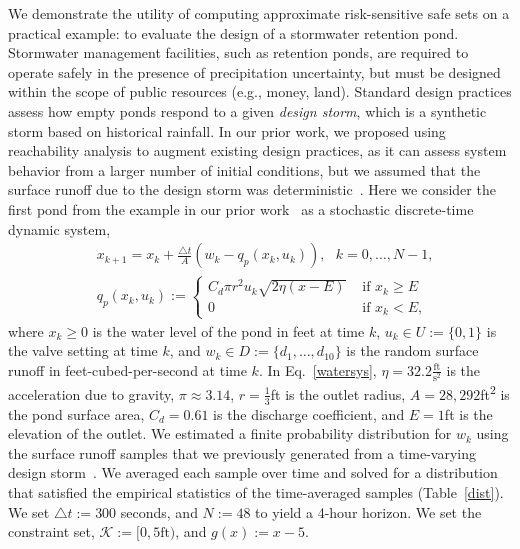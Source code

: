 \documentclass[letterpaper, 10 pt, conference]{ieeeconf}  %
\begin{document}
We demonstrate the utility of computing approximate risk-sensitive safe sets on a practical example:
to evaluate the design of a stormwater retention pond. 
Stormwater management facilities, such as retention ponds, are required to operate safely 
in the presence of precipitation uncertainty, but must be designed within the scope of public resources (e.g., money, land). 
Standard design practices assess how empty ponds respond to a given \textit{design storm},
which is a synthetic storm based on historical rainfall.  
In our prior work, we proposed using reachability analysis to augment existing design practices, as it can assess 
system behavior from a larger number of initial conditions, but we assumed that the surface runoff due to the design storm was deterministic~\cite{sustech}.
Here we consider the first pond from the example in our prior work~\cite{sustech} as a stochastic discrete-time dynamic system,
\begin{equation}\begin{aligned}
& x_{k+1} = x_k + \frac{\triangle t}{A} (w_k - q_p(x_k, u_k)), \text{ }k = 0, \dots, N-1, \\
& q_p(x_k,u_k) := \begin{cases} C_d \pi r^2 u_k \sqrt{ 2\eta(x-E) } & \text{ if } x_k \geq E \\
						0 & \text{ if } x_k < E, \end{cases}
\end{aligned}\label{watersys}\end{equation}
where $x_k \geq 0$ is the water level of the pond in feet at time $k$, $u_k \in U := \{0, 1\}$ is the valve setting at time $k$,
and $w_k \in D := \{d_1, \dots, d_{10}\}$ is the random surface runoff in feet-cubed-per-second at time $k$.
In Eq.~\eqref{watersys}, $\eta = 32.2\frac{\text{ft}}{\text{s}^2}$ is the acceleration due to gravity, $\pi \approx 3.14$, 
$r = \frac{1}{3}$ft is the outlet radius, $A = 28,292$ft\textsuperscript{2} is the pond surface area, $C_d = 0.61$ is the discharge coefficient,
and $E = 1$ft is the elevation of the outlet. %
We estimated a finite probability distribution for $w_k$ using the surface runoff samples that we previously generated from a time-varying design storm~\cite{sustech}. 
We averaged each sample over time and solved for a distribution
that satisfied the empirical statistics of the time-averaged samples (Table~\ref{dist}). 
We set $\triangle t := 300$ seconds, and $N := 48$ to yield a 4-hour horizon.
We set the constraint set, $\mathcal{K} := [0, 5\text{ft})$, and $g(x) := x - 5$.
\end{document}
